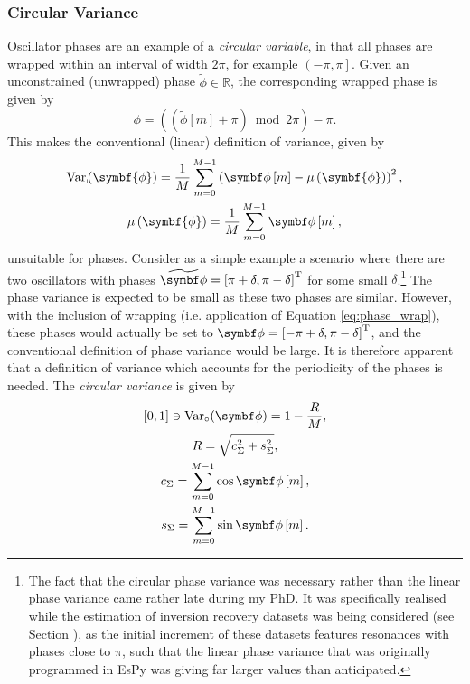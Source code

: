 \subsubsection{Circular Variance}
Oscillator phases are an example of a \emph{circular variable}, in that all
phases are wrapped within an interval of width $2 \pi$, for example $\left(
-\pi, \pi \right]$. Given an unconstrained (unwrapped) phase
$\widetilde{\phi} \in \mathbb{R}$, the corresponding wrapped
phase is given by
\begin{equation}
    \phi = \left(\left(\widetilde{\phi}\left[ m \right] + \pi\right) \bmod 2 \pi\right) - \pi.
    \label{eq:phase_wrap}
\end{equation}
This makes the conventional (linear)
definition of variance, given by
\begin{subequations}
    \begin{gather}
        \Var_{\shortmid}\hspace*{-3pt}\left(\symbf{\phi}\right) =
            \frac{1}{M} \sum_{m=0}^{M-1} \left(\bdphim - \mu\left(\symbf{\phi}\right)\right)^2, \\
        \mu\left(\symbf{\phi}\right) = \frac{1}{M} \sum_{m=0}^{M-1} \bdphim,
    \end{gather}
\end{subequations}
unsuitable for phases. Consider as a simple example a scenario
where there are two oscillators with phases $\widetilde{\bdphi} = \left[ \pi +
    \delta, \pi - \delta \right]\T$ for some small $\delta$.\footnote{
    The fact that the circular phase variance was necessary rather than the
    linear phase variance came rather late during my PhD. It was specifically
    realised while the estimation of inversion recovery datasets was being
    considered (see Section ), as the initial increment of
    these datasets features resonances with phases close to $\pi$, such that
    the linear phase variance that was originally programmed in \ac{EsPy} was
    giving far larger values than anticipated.
}
The phase variance is expected to be small as these two phases are similar.
However, with the inclusion of wrapping (i.e. application of Equation
\ref{eq:phase_wrap}), these phases would actually be set to $\bdphi = \left[ -\pi
+ \delta, \pi - \delta \right]\T$, and the conventional definition of phase
variance would be large. It is therefore apparent that a definition of variance
which accounts for the periodicity of the phases is needed. The \emph{circular
variance} is given by\cite[Chapter 3]{Fisher1993}
\begin{subequations}
    \begin{gather}
        [0, 1] \ni \circvar = 1 - \frac{R}{M},\\
        R = \sqrt{c_{\Sigma}^2 + s_{\Sigma}^2}, \\
        c_{\Sigma} = \sum_{m=0}^{M-1} \cos \bdphim, \\
        s_{\Sigma} = \sum_{m=0}^{M-1} \sin \bdphim.
    \end{gather}
\end{subequations}
